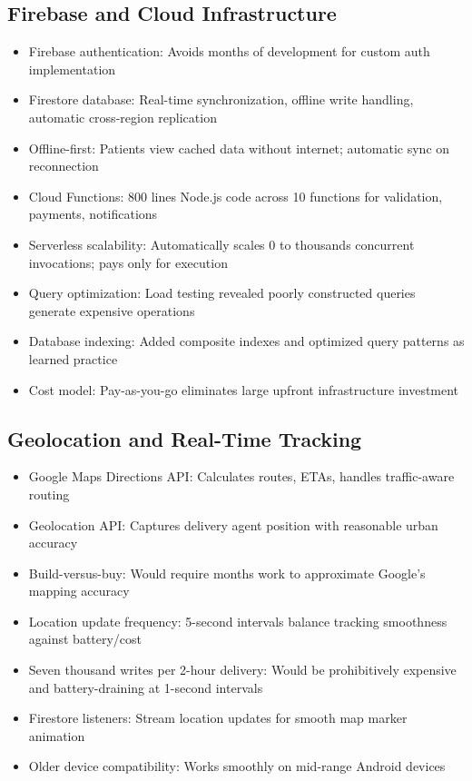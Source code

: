 \documentclass[12pt,a4paper]{report}
\begin{document}
\subsection{Firebase and Cloud Infrastructure}

\begin{itemize}
  \item Firebase authentication: Avoids months of development for custom auth implementation
  \item Firestore database: Real-time synchronization, offline write handling, automatic cross-region replication
  \item Offline-first: Patients view cached data without internet; automatic sync on reconnection
  \item Cloud Functions: 800 lines Node.js code across 10 functions for validation, payments, notifications
  \item Serverless scalability: Automatically scales 0 to thousands concurrent invocations; pays only for execution
  \item Query optimization: Load testing revealed poorly constructed queries generate expensive operations
  \item Database indexing: Added composite indexes and optimized query patterns as learned practice
  \item Cost model: Pay-as-you-go eliminates large upfront infrastructure investment
\end{itemize}

\subsection{Geolocation and Real-Time Tracking}

\begin{itemize}
  \item Google Maps Directions API: Calculates routes, ETAs, handles traffic-aware routing
  \item Geolocation API: Captures delivery agent position with reasonable urban accuracy
  \item Build-versus-buy: Would require months work to approximate Google's mapping accuracy
  \item Location update frequency: 5-second intervals balance tracking smoothness against battery/cost
  \item Seven thousand writes per 2-hour delivery: Would be prohibitively expensive and battery-draining at 1-second intervals
  \item Firestore listeners: Stream location updates for smooth map marker animation
  \item Older device compatibility: Works smoothly on mid-range Android devices
\end{itemize}
\end{document}
